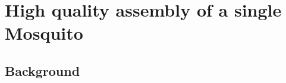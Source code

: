 \chapter{High quality assembly of a single Mosquito}

\ifpdf
    \graphicspath{{Chapter3/Figs/Raster/}{Chapter3/Figs/PDF/}{Chapter3/Figs/}}
\else
    \graphicspath{{Chapter3/Figs/Vector/}{Chapter3/Figs/}}
\fi



\section{Background}
